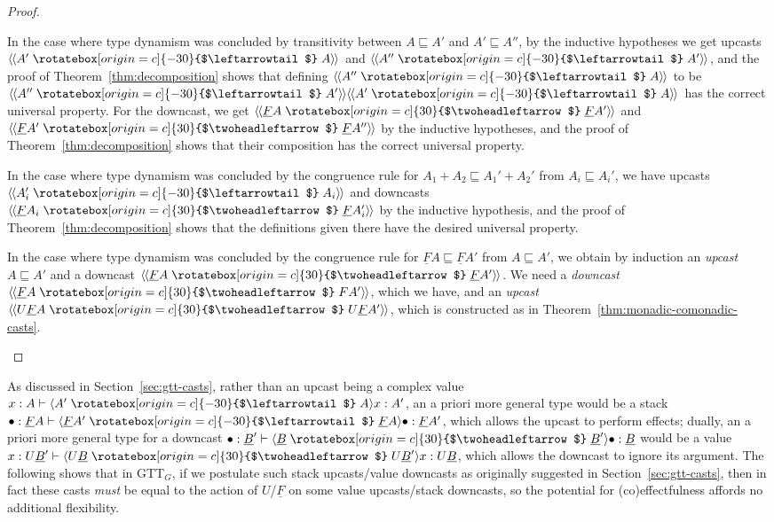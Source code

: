 \documentclass[acmsmall,screen,12pt]{acmart}
\renewcommand{\u}{\underline}
\newcommand{\ltdyn}{\sqsubseteq}
\newcommand{\uarrow}{\mathrel{\rotatebox[origin=c]{-30}{$\leftarrowtail$}}}
\newcommand{\darrow}{\mathrel{\rotatebox[origin=c]{30}{$\twoheadleftarrow$}}}
\newcommand{\upcast}[2]{\langle{#2}\uarrow{#1}\rangle}
\newcommand{\dncast}[2]{\langle{#1}\darrow{#2}\rangle}
\newcommand{\defupcast}[2]{\langle\kern-1ex~\langle{#2}\uarrow{#1}\rangle\kern-1ex~\rangle}
\newcommand{\defdncast}[2]{\langle\kern-1ex~\langle{#1}\darrow{#2}\rangle\kern-1ex~\rangle}
\begin{document}
\begin{proof}
\begin{longonly}
  In the case where type dynamism was concluded by
  transitivity between $A \ltdyn A'$ and $A' \ltdyn A''$, by the
  inductive hypotheses we get upcasts $\defupcast{A}{A'}$ and
  $\defupcast{A'}{A''}$, and the proof of
   Theorem~\ref{thm:decomposition} shows that defining
  $\defupcast{A}{A''}$ to be $\defupcast{A'}{A''}{\defupcast{A}{A'}}$
  has the correct universal property.  For the downcast, we get
  $\defdncast{\u F A}{\u F A'}$ and
  $\defdncast{\u F A'}{\u F A''}$ by the inductive hypotheses, and the
  proof of Theorem~\ref{thm:decomposition} shows that their composition
  has the correct universal property.
  
  In the case where type dynamism was concluded by the congruence rule
  for $A_1 + A_2 \ltdyn A_1' + A_2'$ from $A_i \ltdyn A_i'$, we have
  upcasts $\defupcast{A_i}{A_i'}$ and downcasts $\defdncast{\u F A_i}{\u
    F A_i'}$ by the inductive hypothesis, and the proof of
  Theorem~\ref{thm:decomposition} shows that the definitions given there
  have the desired universal property.
  
  In the case where type dynamism was concluded by the congruence rule
  for $\u F A \ltdyn \u F A'$ from $A \ltdyn A'$, we obtain by induction
  an \emph{upcast} $A \ltdyn A'$ and a downcast $\defdncast{\u F A}{\u F A'}$.
  We need a 
  \emph{downcast} $\defdncast{\u F A}{F A'}$, which we have,
  and an \emph{upcast} $\defdncast{U \u F A}{U \u F A'}$, which is
  constructed as in Theorem~\ref{thm:monadic-comonadic-casts}.
  \end{longonly}
\end{proof}

As discussed in Section~\ref{sec:gtt-casts}, rather than an upcast being
a complex value $x : A \vdash \upcast{A}{A'}{x} : A'$, an a priori more
general type would be a stack $\bullet : \u F A \vdash \upcast{\u F
  A}{\u F A'}{\bullet} : \u F A'$, which allows the upcast to perform
effects; dually, an a priori more general type for a downcast $\bullet :
\u B' \vdash \dncast{\u B}{\u B'}{\bullet} : \u B$ would be a value $x :
U \u B' \vdash \dncast{U \u B}{U \u B'}{x} : U \u B$, which allows the
downcast to ignore its argument.  The following shows that in GTT$_G$,
if we postulate such stack upcasts/value downcasts as originally
suggested in Section~\ref{sec:gtt-casts}, then in fact these casts
\emph{must} be equal to the action of $U$/$\u F$ on some
value upcasts/stack downcasts, so the potential
for (co)effectfulness affords no additional flexibility.
\end{document}
